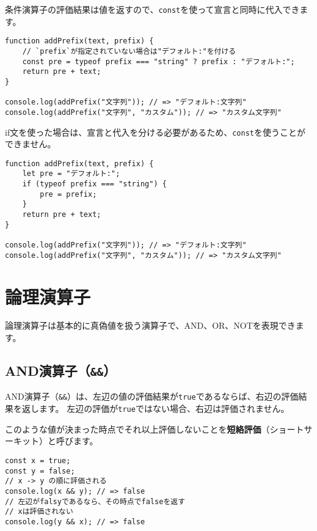 条件演算子の評価結果は値を返すので、\texttt{const}を使って宣言と同時に代入できます。

\begin{lstlisting}
function addPrefix(text, prefix) {
    // `prefix`が指定されていない場合は"デフォルト:"を付ける
    const pre = typeof prefix === "string" ? prefix : "デフォルト:";
    return pre + text;
}

console.log(addPrefix("文字列")); // => "デフォルト:文字列"
console.log(addPrefix("文字列", "カスタム")); // => "カスタム文字列"
\end{lstlisting}

if文を使った場合は、宣言と代入を分ける必要があるため、\texttt{const}を使うことができません。

\begin{lstlisting}
function addPrefix(text, prefix) {
    let pre = "デフォルト:";
    if (typeof prefix === "string") {
        pre = prefix;
    }
    return pre + text;
}

console.log(addPrefix("文字列")); // => "デフォルト:文字列"
console.log(addPrefix("文字列", "カスタム")); // => "カスタム文字列"
\end{lstlisting}

\hypertarget{logical-operator}{%
\section{論理演算子}\label{logical-operator}}

論理演算子は基本的に真偽値を扱う演算子で、AND、OR、NOTを表現できます。

\hypertarget{and-operator}{%
\subsection{\texorpdfstring{AND演算子（\texttt{\&\&}）}{AND演算子（\&\&）}}\label{and-operator}}

AND演算子（\texttt{\&\&}）は、左辺の値の評価結果が\texttt{true}であるならば、右辺の評価結果を返します。
左辺の評価が\texttt{true}ではない場合、右辺は評価されません。

このような値が決まった時点でそれ以上評価しないことを\textbf{短絡評価}（ショートサーキット）と呼びます。

\begin{lstlisting}
const x = true;
const y = false;
// x -> y の順に評価される
console.log(x && y); // => false
// 左辺がfalsyであるなら、その時点でfalseを返す
// xは評価されない
console.log(y && x); // => false
\end{lstlisting}

